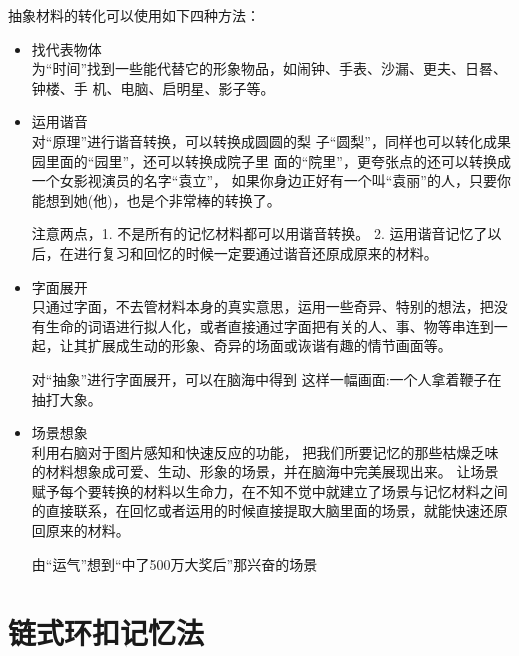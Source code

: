 抽象材料的转化可以使用如下四种方法：
\begin{itemize}
\item 找代表物体\\
  为“时间”找到一些能代替它的形象物品，如闹钟、手表、沙漏、更夫、日晷、钟楼、手 机、电脑、启明星、影子等。
\item 运用谐音\\
  对“原理”进行谐音转换，可以转换成圆圆的梨 子“圆梨”，同样也可以转化成果园里面的“园里”，还可以转换成院子里 面的“院里”，更夸张点的还可以转换成一个女影视演员的名字“袁立”， 如果你身边正好有一个叫“袁丽”的人，只要你能想到她(他)，也是个非常棒的转换了。

  注意两点，1. 不是所有的记忆材料都可以用谐音转换。
  2. 运用谐音记忆了以后，在进行复习和回忆的时候一定要通过谐音还原成原来的材料。
\item 字面展开\\
  只通过字面，不去管材料本身的真实意思，运用一些奇异、特别的想法，把没有生命的词语进行拟人化，或者直接通过字面把有关的人、事、物等串连到一起，让其扩展成生动的形象、奇异的场面或诙谐有趣的情节画面等。
  
  对“抽象”进行字面展开，可以在脑海中得到 这样一幅画面:一个人拿着鞭子在抽打大象。
\item 场景想象\\
  利用右脑对于图片感知和快速反应的功能， 把我们所要记忆的那些枯燥乏味的材料想象成可爱、生动、形象的场景，并在脑海中完美展现出来。
  让场景赋予每个要转换的材料以生命力，在不知不觉中就建立了场景与记忆材料之间的直接联系，在回忆或者运用的时候直接提取大脑里面的场景，就能快速还原回原来的材料。

  由“运气”想到“中了500万大奖后”那兴奋的场景
\end{itemize}



\section{链式环扣记忆法}

